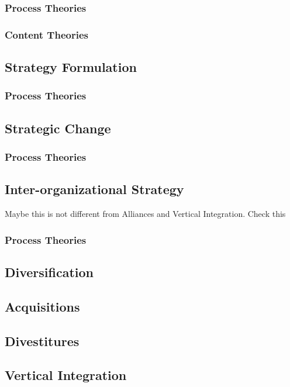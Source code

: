 \documentclass[12pt,letterpaper]{article}
\begin{document}
\subsubsection{Process Theories}
\subsubsection{Content Theories}

\subsection{Strategy Formulation}
\subsubsection{Process Theories}

\subsection{Strategic Change}
\subsubsection{Process Theories}

\subsection{Inter-organizational Strategy}
Maybe this is not different from Alliances and Vertical Integration. Check this
\subsubsection{Process Theories}

\subsection{Diversification}

\subsection{Acquisitions}

\subsection{Divestitures}

\subsection{Vertical Integration}
\end{document}
